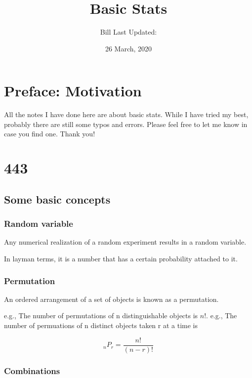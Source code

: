 \documentclass[]{book}
\title{Basic Stats}
\author{Bill Last Updated:}
\date{26 March, 2020}
\begin{document}
\maketitle

{
\setcounter{tocdepth}{1}
\tableofcontents
}
\hypertarget{my-section}{%
\chapter*{Preface: Motivation}\label{my-section}}

All the notes I have done here are about basic stats. While I have tried my best, probably there are still some typos and errors. Please feel free to let me know in case you find one. Thank you!

\hypertarget{section}{%
\chapter{443}\label{section}}

\hypertarget{some-basic-concepts}{%
\section{Some basic concepts}\label{some-basic-concepts}}

\hypertarget{random-variable}{%
\subsection{Random variable}\label{random-variable}}

Any numerical realization of a random experiment results in a random variable.

In layman terms, it is a number that has a certain probability attached to it.

\hypertarget{permutation}{%
\subsection{Permutation}\label{permutation}}

An ordered arrangement of a set of objects is known as a permutation.

e.g., The number of permutations of n distinguishable objects is \(n!\).
e.g., The number of permuations of n distinct objects taken r at a time is

\[_{n}P_r=\frac{n!}{(n-r)!}\]

\hypertarget{combinations}{%
\subsection{Combinations}\label{combinations}}
\end{document}
